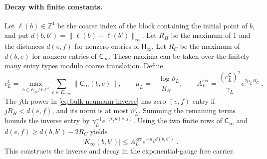 \documentclass[11pt]{article}
\begin{document}
\paragraph{Decay with finite constants.}
Let $\ell(b)\in\mathbb Z^4$ be the coarse index of the block containing the initial point of $b$, and put $d(b,b')=\|\ell(b)-\ell(b')\|_\infty$. Let $R_H$ be the maximum of $1$ and the distances $d(e,f)$ for nonzero entries of $\mathsf H_\infty$. Let $R_C$ be the maximum of $d(b,e)$ for nonzero entries of $\mathsf C_\infty$. These maxima can be taken over the finitely many entry types modulo coarse translation. Define
\begin{equation}\label{eq:bulk-decay-constants}
    c_L^{\mathsf C}=\max_{b\in E_\infty/L\mathbb Z^4}
        \sum_{e\in E_{*,\infty}}\|\mathsf C_\infty(b,e)\|,
    \qquad
    \mu_L=\frac{-\log\vartheta_L}{R_H},
    \qquad
    A_L^{\mathrm{ker}}=\frac{(c_L^{\mathsf C})^2}{\gamma_L}e^{2\mu_LR_C}\;.
\end{equation}
The $j$th power in \eqref{eq:bulk-neumann-inverse} has zero $(e,f)$ entry if $jR_H<d(e,f)$, and its norm is at most $\vartheta_L^j$. Summing the remaining terms bounds the inverse entry by $\gamma_L^{-1}e^{-\mu_Ld(e,f)}$. Using the two finite rows of $\mathsf C_\infty$ and $d(e,f)\geq d(b,b')-2R_C$ yields
\begin{equation}\label{eq:bulk-kernel-decay}
    |K_\infty(b,b')|
        \leq A_L^{\mathrm{ker}}e^{-\mu_Ld(b,b')}\;.
\end{equation}
This constructs the inverse and decay in the exponential-gauge free carrier.
\end{document}
